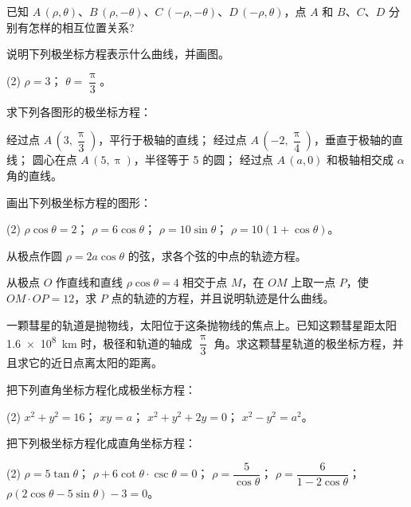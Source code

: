 \begin{Exercise}
  \begin{question}
    \item 已知 $A\,(\rho,\theta)$、$B\,(\rho,-\theta)$、$C\,(-\rho,-\theta)$、$D\,(-\rho,\theta)$，点 $A$ 和 $B$、$C$、$D$ 分别有怎样的相互位置关系?
    \item 说明下列极坐标方程表示什么曲线，并画图。
    \begin{tasks}(2)
      \task $\rho=3$；
      \task $\theta=\dfrac{\uppi}{3}$。
    \end{tasks}
    \item 求下列各图形的极坐标方程：
    \begin{tasks}
      \task 经过点 $A\,(3,\dfrac{\uppi}{3})$，平行于极轴的直线；
      \task 经过点 $A\,(-2,\dfrac{\uppi}{4})$，垂直于极轴的直线；
      \task 圆心在点 $A\,(5,\uppi)$，半径等于 5 的圆；
      \task 经过点 $A\,(a,0)$ 和极轴相交成 $\alpha$ 角的直线。
    \end{tasks}
    \item 画出下列极坐标方程的图形：
    \begin{tasks}(2)
      \task $\rho\cos\theta=2$；
      \task $\rho=6\cos\theta$；
      \task $\rho=10\sin\theta$；
      \task $\rho=10(1+\cos\theta)$。
    \end{tasks}
    \item 从极点作圆 $\rho=2a\cos\theta$ 的弦，求各个弦的中点的轨迹方程。
    \item 从极点 $O$ 作直线和直线 $\rho\cos\theta=4$ 相交于点 $M$，在 $OM$ 上取一点 $P$，使 $OM\cdot OP=12$，求 $P$ 点的轨迹的方程，并且说明轨迹是什么曲线。
    \item 一颗彗星的轨道是抛物线，太阳位于这条抛物线的焦点上。已知这颗彗星距太阳 \qty{1.6e8}{km} 时，极径和轨道的轴成 $\dfrac{\uppi}{3}$ 角。求这颗彗星轨道的极坐标方程，并且求它的近日点离太阳的距离。
    \item 把下列直角坐标方程化成极坐标方程：
    \begin{tasks}(2)
      \task $x^2+y^2=16$；
      \task $xy=a$；
      \task $x^2+y^2+2y=0$；
      \task $x^2-y^2=a^2$。
    \end{tasks}
    \item 把下列极坐标方程化成直角坐标方程：
    \begin{tasks}(2)
      \task $\rho=5\tan\theta$；
      \task $\rho+6\cot\theta\cdot\csc\theta=0$；
      \task $\rho=\dfrac{5}{\cos\theta}$；
      \task $\rho=\dfrac{6}{1-2\cos\theta}$；
      \task $\rho(2\cos\theta-5\sin\theta)-3=0$。
    \end{tasks}

\end{question}
\end{Exercise}
